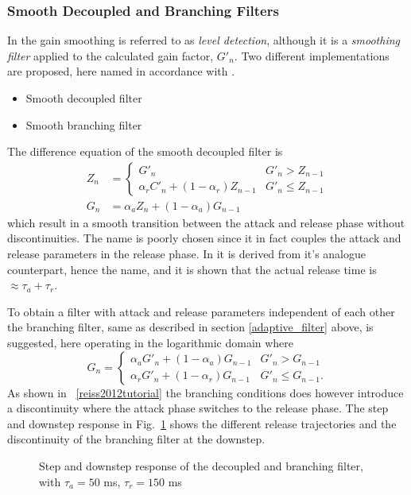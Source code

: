 \documentclass[../main2.tex]{subfiles}
\providecommand{\rootdir}{..}
\begin{document}
\subsubsection{Smooth Decoupled and Branching Filters}
In \cite{reiss2012tutorial} the gain smoothing is referred to as \emph{level detection}, although it is a \emph{smoothing filter} applied to the calculated gain factor, $G'_n$. Two different implementations are proposed, here named in accordance with \cite{reiss2012tutorial}.
\begin{itemize}
\item{Smooth decoupled filter}
\item{Smooth branching filter}
\end{itemize}
The difference equation of the smooth decoupled filter is
\begin{equation}
\begin{split}
Z_n &= \begin{cases}
   G'_n								& G'_n > Z_{n-1} \\
    \alpha_{r} C'_n + (1-\alpha_{r}) Z_{n-1} 	& G'_n \leq Z_{n-1}
\end{cases} \\
G_n &= \alpha_{a} Z_n + (1-\alpha_{a}) G_{n-1}
\end{split}
\end{equation}
which result in a smooth transition between the attack and release phase without discontinuities. The name is poorly chosen since it in fact couples the attack and release parameters in the release phase. In \cite{reiss2012tutorial} it is derived from it's analogue counterpart, hence the name, and it is shown that the actual release time is $\approx \tau_a + \tau_r$.

To obtain a filter with attack and release parameters independent of each other the branching filter, same as described in section \ref{adaptive_filter} above, is suggested, here operating in the logarithmic domain where 
\begin{equation}
G_n = \begin{cases}
    \alpha_{a} G'_n + (1-\alpha_{a}) G_{n-1} 	& G'_n > G_{n-1} \\
    \alpha_{r} G'_n + (1-\alpha_{r}) G_{n-1} 	& G'_n \leq G_{n-1}.
\end{cases}
\end{equation}
As shown in ~\ref{reiss2012tutorial} the branching conditions does however introduce a discontinuity where the attack phase switches to the release phase. The step and downstep response in Fig.~\ref{fig:step_reiss_filter} shows the different release trajectories and the discontinuity of the branching filter at the downstep.
\begin{figure}
\centerline{}
\caption{Step and downstep response of the decoupled and branching filter, with $\tau_a = 50$ ms, $\tau_r = 150$ ms}
\label{fig:step_reiss_filter}
\end{figure}
\end{document}
